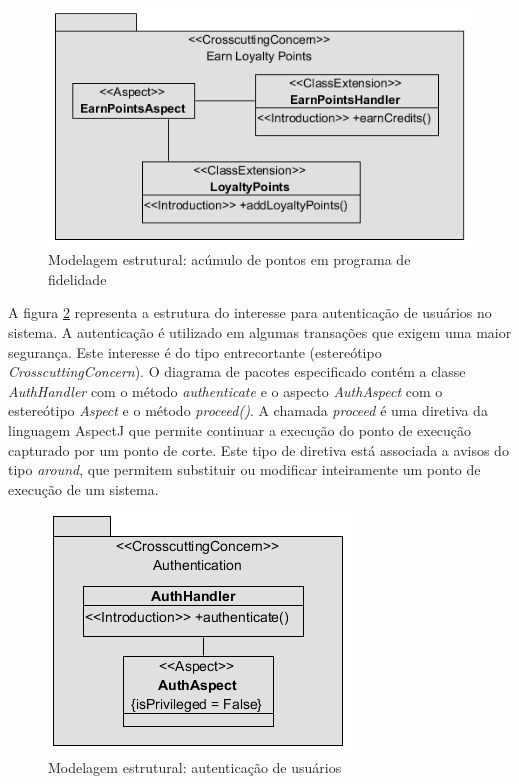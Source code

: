   \begin{figure}[!h]
	\centering
	\includegraphics{img/case_study_structural_earn_points.png}
	\caption{Modelagem estrutural: acúmulo de pontos em programa de fidelidade}\label{fig:case_study_structural_earn_points}
  \end{figure}
  
A figura \ref{fig:case_study_structural_authentication} representa a estrutura do interesse para autenticação de usuários no sistema. A autenticação é
utilizado em algumas transações que exigem uma maior segurança. Este interesse é do tipo entrecortante (estereótipo \textit{CrosscuttingConcern}). O
diagrama de pacotes especificado contém a classe \textit{AuthHandler} com o método \textit{authenticate} e o aspecto \textit{AuthAspect} com o
estereótipo \textit{Aspect} e o método \textit{proceed()}. A chamada \textit{proceed} é uma diretiva da linguagem AspectJ que permite continuar a
execução do ponto de execução capturado por um ponto de corte. Este tipo de diretiva está associada a avisos do tipo \textit{around}, que permitem
substituir ou modificar inteiramente um ponto de execução de um sistema. 

  \begin{figure}[!h]
	\centering
	\includegraphics{img/case_study_structural_authentication.png}
	\caption{Modelagem estrutural: autenticação de usuários}\label{fig:case_study_structural_authentication}
  \end{figure}

